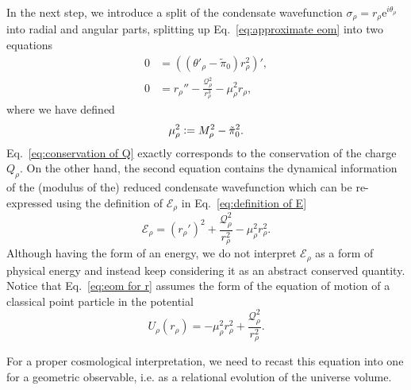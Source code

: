 \documentclass[11pt,a4paper]{article}
\newcommand{\e}{\textrm{e}}
\newcommand{\defeq}{\vcentcolon=}
\begin{document}
In the next step, we introduce a split of the condensate wavefunction $\sigma_{\rho} = r_{\rho}\e^{i\theta_{\rho}}$ into radial and angular parts, splitting up Eq.~\eqref{eq:approximate eom} into two equations
%
\begin{align}
0 &= \left((\theta'_{\rho}-\tilde{\pi}_0)r_{\rho}^2\right)',\label{eq:conservation of Q}\\
0 &= r_{\rho}''-\frac{\mathcal{Q}_{\rho}^2}{r_{\rho}^3}-\mu_{\rho}^2r_{\rho}\label{eq:eom for r},
\end{align}
%
where we have defined 
%
\begin{equation}
\mu_{\rho}^2
\defeq
M_{\rho}^2-\tilde{\pi}_0^2.
\end{equation}
%
Eq.~\eqref{eq:conservation of Q} exactly corresponds to the conservation of the charge $Q_{\rho}$. On the other hand, the second equation contains the dynamical information of the (modulus of the) reduced condensate wavefunction which can be re-expressed using the definition of $\mathcal{E}_{\rho}$ in Eq.~\eqref{eq:definition of E}
%
\begin{equation}\label{eq:eom for r with E}
\mathcal{E}_{\rho}
=
\left(r_{\rho}'\right)^2+\frac{\mathcal{Q}_{\rho}^2}{r_{\rho}^2}-\mu_{\rho}^2r_{\rho}^2.
\end{equation}
%
Although having the form of an energy, we do not interpret $\mathcal{E}_{\rho}$ as a form of physical energy and instead keep considering it as an abstract conserved quantity. Notice that Eq.~\eqref{eq:eom for r} assumes the form of the equation of motion of a classical point particle in the potential 
\begin{equation}
    U_{\rho}(r_{\rho})=-\mu_{\rho}^2 r_{\rho}^2+\frac{\mathcal{Q}_{\rho}^2}{ r_{\rho}^2}.
\end{equation}
%

For a proper cosmological interpretation, we need to recast this equation into one for a geometric observable, i.e. as a relational evolution of the universe volume. 
\end{document}

